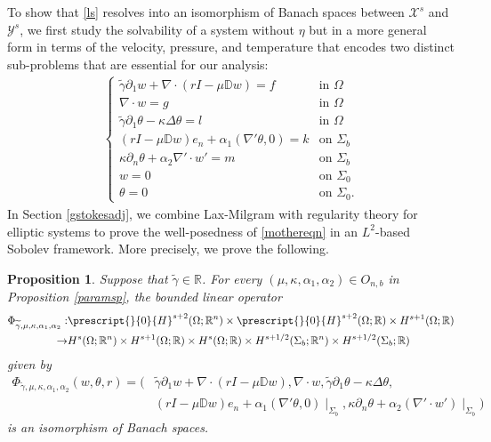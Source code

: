 \documentclass[11pt,letterpaper,reqno]{amsart}
\newtheorem{proposition}[theorem]{Proposition}
\numberwithin{equation}{section}
\begin{document}
To show that \eqref{ls} resolves into an isomorphism of Banach spaces between \(\mathcal{X}^{s}\) and \(\mathcal{Y}^{s}\), we first study the solvability of a system without $\eta$ but in a more general form in terms of the velocity, pressure, and temperature that encodes two distinct sub-problems that are essential for our analysis:
\begin{align}
    \begin{cases} \label{mothereqn}
        \widetilde{\gamma} \partial_{1}w + \nabla \cdot (rI-\mu\mathbb{D}w) = f &\mbox{in \(\Omega\)} \\
        \nabla \cdot w = g &\mbox{in \(\Omega\)} \\
        \widetilde{\gamma} \partial_{1}\theta -\kappa\Delta\theta = l &\mbox{in \(\Omega\)} \\
        (rI-\mu\mathbb{D}w)e_{n}+\alpha_{1}(\nabla'\theta,0) =k &\mbox{on \(\Sigma_{b}\)} \\
        \kappa\partial_{n}\theta +\alpha_{2}\nabla' \cdot w'= m &\mbox{on \(\Sigma_{b}\)} \\
        w = 0 &\mbox{on \(\Sigma_{0}\)} \\
        \theta = 0 &\mbox{on \(\Sigma_{0}\)}.
    \end{cases}
\end{align}
In Section \ref{gstokesadj}, we combine Lax-Milgram with regularity theory for elliptic systems to prove the well-posedness of \eqref{mothereqn} in an \(L^{2}\)-based Sobolev framework.  More precisely, we prove the following. 

\begin{proposition} \label{msys}
    Suppose that \(\widetilde{\gamma} \in \mathbb{R}\). For every \((\mu,\kappa,\alpha_{1}, \alpha_{2}) \in O_{n,b}\) in Proposition \ref{paramsp}, the bounded linear operator
    \begin{align}
        \Phi_{\widetilde{\gamma},\mu,\kappa,\alpha_{1},\alpha_{2}}: &\prescript{}{0}{H}^{s+2}(\Omega;\mathbb{R}^{n}) \times \prescript{}{0}{H}^{s+2}(\Omega;\mathbb{R}) \times H^{s+1}(\Omega;\mathbb{R}) \nonumber \\
        \to& H^{s}(\Omega;\mathbb{R}^{n}) \times H^{s+1}(\Omega;\mathbb{R}) \times H^{s}(\Omega;\mathbb{R})\times H^{s+1/2}(\Sigma_{b};\mathbb{R}^{n}) \times H^{s+1/2}(\Sigma_{b};\mathbb{R})
    \end{align}
    given by
    \begin{align}
        \Phi_{\widetilde{\gamma},\mu,\kappa,\alpha_{1},\alpha_{2}}(w,\theta,r) = (&\widetilde{\gamma}\partial_{1}w + \nabla \cdot (rI-\mu\mathbb{D}w), \nabla \cdot w, \widetilde{\gamma}\partial_{1}\theta-\kappa\Delta\theta, \nonumber\\
        &(rI-\mu\mathbb{D}w)e_{n}+\alpha_{1}(\nabla'\theta,0)\mid_{\Sigma_{b}},\kappa \partial_{n}\theta+\alpha_{2}(\nabla' \cdot w')\mid_{\Sigma_{b}})
    \end{align}
    is an isomorphism of Banach spaces.
\end{proposition}
\end{document}
